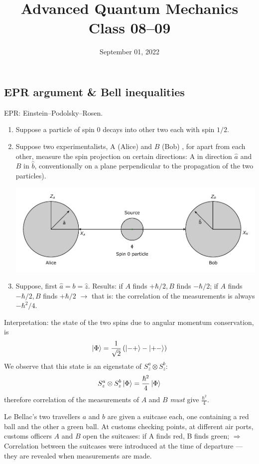 \documentclass[12pt]{article}
\title{Advanced Quantum Mechanics\\Class 08--09}
\date{September 01, 2022}                                           %
\newcommand{\be}{\begin{equation}}
\newcommand{\ee}{\end{equation}}
\begin{document}
\maketitle


\subsection{EPR argument \& Bell inequalities}

EPR: Einstein--Podolsky--Rosen.

\begin{enumerate}
\item Suppose a particle of spin 0 decays into other two
each with spin \(1 / 2\).
%
\item Suppose two experimentalists, A (Alice) and \(B\) (Bob) ,
for apart from each other, measure the spin projection
on certain directions: A in direction \(\hat{a}\) and \(B\) in \(\hat{b}\),
conventionally on a plane perpendicular to the
propagation of the two particles).
%
\begin{center}
\includegraphics[width=\textwidth]{Figures/EPR_illustration.pdf}
\end{center}
\item  Suppose, first \(\hat{a}=b=\hat{z}\). Results: if \(A\) finds
\(+\hbar / 2, B\) finds \(-\hbar / 2\); if \(A\) finds \(-\hbar / 2, B\) finds \(+\hbar / 2\)
$\rightarrow$
that is: the correlation of the measurements
is always \(-\hbar^{2} / 4\).
\end{enumerate}
Interpretation: the state of the two spins due to
angular momentum conservation, is
\be
\ket{\Phi} = \frac{1}{\sqrt{2}}
\left(\ket{-+} - \ket{+-}\right)
\ee
We observe that this state is an eigenstate of
$S_{z}^{a} \otimes S_{z}^{b}$:
\be
S_{z}^{a} \otimes S_{z}^{b}\ket{\Phi} = \frac{\hbar^2}{4} \ket{\Phi}
\ee
therefore correlation  of the measurements of $A$ and $B$
\emph{must} give $\frac{\hbar^2}{4}$.

Le Bellac's two travellers \(a\) and \(b\) are given a
suitcase each, one containing a red ball and
the other a green ball. At customs checking points,
at different air ports, customs officers \(A\) and \(B\)
open the suitcases: if A finds red, B finds green;
$\Rightarrow$
Correlation between the suitcases were
introduced at the time of departure
--- they are revealed when measurements
are made.
\end{document}
